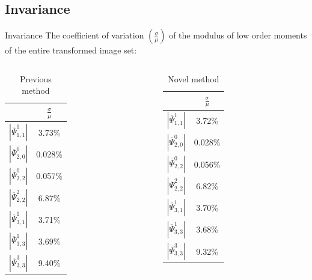\documentclass{beamer}
\begin{document}
\subsection{Invariance}
\begin{frame}{Invariance}
    \vskip 10mm
The coefficient of variation $\left(\frac{\sigma}{\mu}\right)$ of the modulus of low order moments of the entire transformed image set:
\begin{columns}
    \begin{column}{.5\textwidth}
        \begin{table}
            \centering
        \begin{tabular}{| c | c | } \hline
        & $\frac{\sigma}{\mu}$ \\ \hline\hline
        $|\overline{\Psi}_{1,1}^1|$ & 3.73\% \\ \hline
        $|\overline{\Psi}_{2,0}^0|$ & 0.028\% \\ \hline
        $|\overline{\Psi}_{2,2}^0|$ & 0.057\% \\ \hline
        $|\overline{\Psi}_{2,2}^2|$ & 6.87\% \\ \hline
        $|\overline{\Psi}_{3,1}^1|$ & 3.71\%  \\ \hline
        $|\overline{\Psi}_{3,3}^1|$ & 3.69\% \\ \hline
        $|\overline{\Psi}_{3,3}^3|$ & 9.40\% \\ \hline
        \end{tabular}
        \caption{Previous method}
        \end{table}
    \end{column}
    \begin{column}{.5\textwidth}
        \begin{table}
            \centering
        \begin{tabular}{| c | c | } \hline
        & $\frac{\sigma}{\mu}$ \\ \hline\hline
        $|\overline{\Psi}_{1,1}^1|$ & 3.72\% \\ \hline
        $|\overline{\Psi}_{2,0}^0|$ & 0.028\%\\ \hline
        $|\overline{\Psi}_{2,2}^0|$ & 0.056\%\\ \hline
        $|\overline{\Psi}_{2,2}^2|$ & 6.82\%\\ \hline
        $|\overline{\Psi}_{3,1}^1|$ & 3.70\%\\ \hline
        $|\overline{\Psi}_{3,3}^1|$ & 3.68\%\\ \hline
        $|\overline{\Psi}_{3,3}^3|$ & 9.32\%\\ \hline
        \end{tabular}
        \caption{Novel method}
        \end{table}
    \end{column}
\end{columns}
\end{frame}
\end{document}
